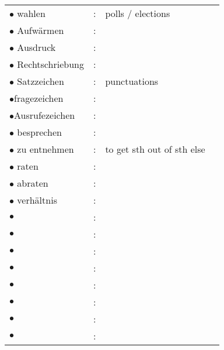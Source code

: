 \documentclass[a4paper,twocolumn,10pt]{article}
\newcommand{\bulletpoint}
{ $\bullet$  }
\begin{document}
\begin{tabularx}{0.95\linewidth}{lllX}
\rowcolor{white} $\bullet$ wahlen          & : & polls / elections                   & \\
\rowcolor{white} $\bullet$ Aufwärmen       & : &                                     & \\
\rowcolor{white} $\bullet$ Ausdruck        & : &                                     & \\
\rowcolor{white} $\bullet$ Rechtschriebung & : &                                     & \\
\rowcolor{white} \bulletpoint Satzzeichen  & : & punctuations                        & \\
\rowcolor{white} $\bullet$fragezeichen     & : &                                     & \\
\rowcolor{white} $\bullet$Ausrufezeichen   & : &                                     & \\
\rowcolor{white} $\bullet$  besprechen     & : &                                     & \\
\rowcolor{white} $\bullet$ zu entnehmen    & : & to get sth out of sth else          & \\
\rowcolor{white} $\bullet$ raten           & : &                                     & \\
\rowcolor{white} $\bullet$ abraten         & : &                                     & \\
\rowcolor{white} $\bullet$  verhältnis     & : &                                     & \\
\rowcolor{white} $\bullet$                 & : &                                     & \\
\rowcolor{white} $\bullet$                 & : &                                     & \\
\rowcolor{white} $\bullet$                 & : &                                     & \\
\rowcolor{white} $\bullet$                 & : &                                     & \\
\rowcolor{white} $\bullet$                 & : &                                     & \\
\rowcolor{white} $\bullet$                 & : &                                     & \\
\rowcolor{white} $\bullet$                 & : &                                     & \\
\rowcolor{white} $\bullet$                 & : &                                     & \\

\end{tabularx}
\end{document}
